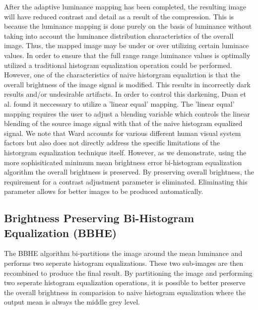 \documentclass[twocolumn]{article}
\begin{document}
After the adaptive luminance mapping has been completed, the resulting image will have reduced contrast and detail as a result of the compression. This is because the luminance mapping is done purely on the basis of luminance without taking into account the luminance distribution characteristics of the overall image. Thus, the mapped image may be under or over utilizing certain luminace values. In order to ensure that the full range range luminance values is optimally utilized a traditional histogram equalization operation could be performed. However, one of the characteristics of naive historgram equaliztion is that the overall brightness of the image signal is modified. This results in incorrectly dark results and/or undesirable artifacts. In order to control this darkening, Duan et al. found it neccessary to utilize a 'linear equal' mapping. The 'linear equal' mapping requires the user to adjust a blending variable which controls the linear blending of the source image signal with that of the naive histogram equalized signal. We note that Ward accounts for various different human visual system factors but also does not directly address the specific limitations of the historgram equalization technique itself.\cite{ward97} However, as we demonstrate, using the more sophisiticated minimum mean brightness error bi-histogram equalization algorithm the overall brightness is preserved. By preserving overall brightness,  the requirement for a contrast adjustment parameter is eliminated. Eliminating this parameter allows for better images to be produced automatically.

\subsection{Brightness Preserving Bi-Histogram Equalization (BBHE)}

The BBHE algorithm bi-partitions the image around the mean luminance and performs two seperate histogram equalizations. These two sub-images are then recombined to produce the final result. By partitioning the image and performing two seperate histogram equalization operations, it is possible to better preserve the overall brightness in comparision to naive histogram equalization where the output mean is always the middle grey level.\cite{kim96}
\end{document}
